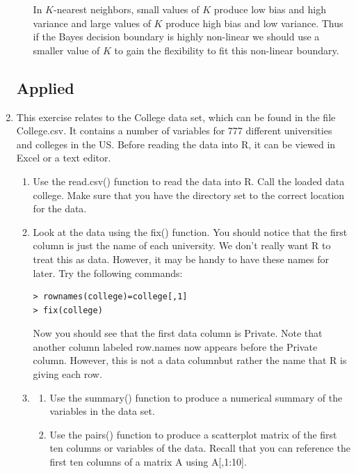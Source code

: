 \documentclass[11pt]{article}
\providecommand{\code}[1]{{\color{red}\ttfamily #1}}
\begin{document}
\begin{enumerate}
\begin{enumerate}
In $K$-nearest neighbors, small values of $K$ produce low bias and high variance and large values of $K$ produce high bias and low variance.  Thus if the Bayes decision boundary is highly non-linear we should use a smaller value of $K$ to gain the flexibility to fit this non-linear boundary.
\end{enumerate}



\subsection*{Applied}
\item This exercise relates to the \code{College} data set, which can be found in the file \code{College.csv}.  It contains a number of variables for 777 different universities and colleges in the US.  Before reading the data into \code{R}, it can be viewed in Excel or a text editor.
\begin{enumerate}
\item Use the \code{read.csv()} function to read the data into \code{R}.  Call the loaded data \code{college}.  Make sure that you have the directory set to the correct location for the data.
\item Look at the data using the \code{fix()} function.  You should notice that the first column is just the name of each university.  We don't really want \code{R} to treat this as data.  However, it may be handy to have these names for later.  Try the following commands:

\begin{lstlisting}
> rownames(college)=college[,1]
> fix(college)
\end{lstlisting}

Now you should see that the first data column is \code{Private}.  Note that another column labeled \code{row.names} now appears before the \code{Private} column.  However, this is not a data columnbut rather the name that \code{R} is giving each row.

\item\begin{enumerate}
\item Use the \code{summary()} function to produce a numerical summary of the variables in the data set.
\item Use the \code{pairs()} function to produce a scatterplot matrix of the first ten columns or variables of the data.  Recall that you can reference the first ten columns of a matrix \code{A} using \code{A[,1:10]}.


\end{enumerate}
\end{enumerate}
\end{enumerate}
\end{document}
